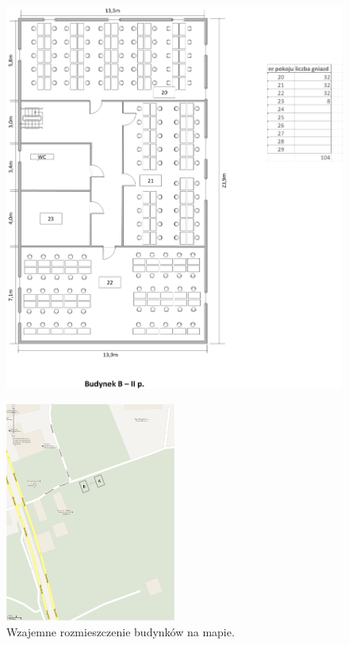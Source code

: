 \documentclass{report}
\begin{document}
\begin{figure}[H]
  \centering
      \includegraphics[width=\textwidth]{./obrazki/plany_wew/b2.png}
\end{figure}



\begin{figure}[H]
  \centering
      \includegraphics[width=0.5\textwidth]{./obrazki/rzut_terenowy.png}
    \caption{Wzajemne rozmieszczenie budynków na mapie.}
\end{figure}
\end{document}
